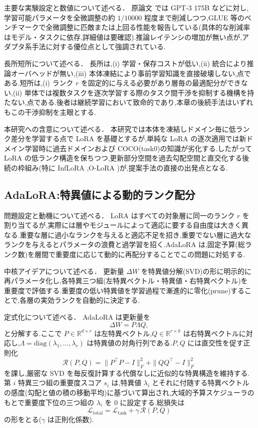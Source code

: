 主要な実験設定と数値について述べる．
原論文 \cite{lora} では GPT-3 175B などに対し,学習可能パラメータを全微調整の約 $1/10000$ 程度まで削減しつつ,GLUE 等のベンチマークで全微調整に匹敵または上回る性能を報告している(具体的な削減率はモデル・タスクに依存,詳細値は要確認).推論レイテンシの増加が無い点が,アダプタ系手法に対する優位点として強調されている.

長所短所について述べる．
長所は,(i) 学習・保存コストが低い,(ii) 統合により推論オーバヘッドが無い,(iii) 本体凍結により事前学習知識を直接破壊しない,点である.短所は,(i) ランク $r$ を固定的に与える必要があり層毎の最適配分ができない,(ii) 単体では複数タスクを逐次学習する際のタスク間干渉を抑制する機構を持たない,点である.後者は継続学習において致命的であり,本章の後続手法はいずれもこの干渉抑制を主眼とする.

本研究への含意について述べる．
本研究では本体を凍結しドメイン毎に低ランク差分を学習する点で LoRA を基礎とするが,単純な LoRA の逐次適用では新ドメイン学習時に過去ドメインおよび COCO(task0)の知識が劣化する.したがって LoRA の低ランク構造を保ちつつ,更新部分空間を過去勾配空間と直交化する後続の枠組み(特に InfLoRA \cite{inflora},O-LoRA \cite{olora})が,提案手法の直接の出発点となる.

\subsection{AdaLoRA:特異値による動的ランク配分}

問題設定と動機について述べる．
LoRA はすべての対象層に同一のランク $r$ を割り当てるが,実際には層やモジュールによって適応に要する自由度は大きく異なる.重要な層に過小なランクを与えると適応不足を招き,重要でない層に過大なランクを与えるとパラメータの浪費と過学習を招く.AdaLoRA \cite{adalora} は,固定予算(総ランク数)を層間で重要度に応じて動的に再配分することでこの問題に対処する.

中核アイデアについて述べる．
更新量 $\Delta W$ を特異値分解(SVD)の形に明示的に再パラメータ化し,各特異三つ組(左特異ベクトル・特異値・右特異ベクトル)を重要度で評価する.重要度の低い特異値を学習過程で漸進的に零化(prune)することで,各層の実効ランクを自動的に決定する.

定式化について述べる．
AdaLoRA は更新量を
\begin{equation}
\Delta W = P \Lambda Q,
\end{equation}
と分解する.ここで $P \in \mathbb{R}^{d \times r}$ は左特異ベクトル,$Q \in \mathbb{R}^{r \times k}$ は右特異ベクトルに対応し,$\Lambda = \mathrm{diag}(\lambda_1, \dots, \lambda_r)$ は特異値の対角行列である.$P, Q$ には直交性を促す正則化
\begin{equation}
\mathcal{R}(P,Q) = \| P^\top P - I \|_F^2 + \| Q Q^\top - I \|_F^2
\end{equation}
を課し,厳密な SVD を毎反復計算する代償なしに近似的な特異構造を維持する.第 $i$ 特異三つ組の重要度スコア $s_i$ は,特異値 $\lambda_i$ とそれに付随する特異ベクトルの感度(勾配と値の積の移動平均)に基づいて算出され,大域的予算スケジューラのもとで重要度下位の三つ組の $\lambda_i$ を $0$ に設定する.総損失は
\begin{equation}
\mathcal{L}_{\text{total}} = \mathcal{L}_{\text{task}} + \gamma \, \mathcal{R}(P,Q)
\end{equation}
の形をとる($\gamma$ は正則化係数).

